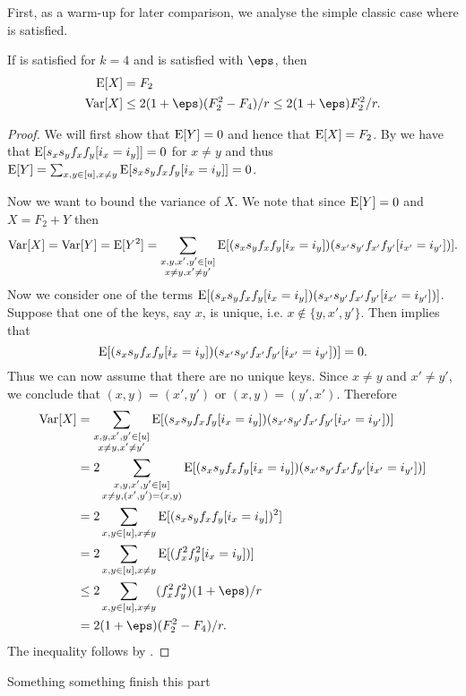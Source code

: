 First, as a warm-up for later comparison, we analyse the simple classic
case where  is satisfied.
\begin{lemma}
    If  is satisfied for $k = 4$ and 
    is satisfied with $\eps$, then
    \begin{align}
        \E[X] &= F_2 \\
        \Var[X] &\le 2(1 + \eps)(F_2^2 - F_4)/r \le 2(1 + \eps)F_2^2/r .
    \end{align}
\end{lemma}
\begin{proof}
    We will first show that $\operatorname*{E}[Y] = 0$ and hence that $\operatorname*{E}[X] = F_2$. By
     we have that $\operatorname*{E}[s_x s_y f_x f_y [i_x = i_y]] = 0$
    for $x \neq y$ and thus $\operatorname*{E}[Y] = \sum_{x,y\in[u],x\neq y} \operatorname*{E}[s_x s_y f_x f_y [i_x = i_y]] = 0$.

    Now we want to bound the variance of $X$. We note that since $\operatorname*{E}[Y] = 0$ and $X = F_2 + Y$ then
    \begin{align*}
        \operatorname*{Var}[X] = \operatorname*{Var}[Y] = \operatorname*{E}[Y^2]
            = \sum_{\substack{x, y, x', y' \in [u]\\ x \neq y, x' \neq y'}} \operatorname*{E}[(s_x s_y f_x f_y [i_x = i_y])(s_{x'} s_{y'} f_{x'} f_{y'} [i_{x'} = i_{y'}])] .
    \end{align*}
    Now we consider one of the terms $\operatorname*{E}[(s_x s_y f_x f_y [i_x = i_y])(s_{x'} s_{y'} f_{x'} f_{y'} [i_{x'} = i_{y'}])]$.
    Suppose that one of the keys, say $x$, is unique, i.e. $x \not\in \{y, x', y'\}$.
    Then  implies that 
    \[
        \operatorname*{E}[(s_x s_y f_x f_y [i_x = i_y])(s_{x'} s_{y'} f_{x'} f_{y'} [i_{x'} = i_{y'}])] = 0 .
    \]
    Thus we can now assume that there are no unique keys. Since $x \neq y$ and $x' \neq y'$, we conclude
    that $(x, y) = (x', y')$ or $(x, y) = (y', x')$. Therefore
    \begin{align*}
       \Var[X] &= \sum_{\substack{x, y, x', y' \in [u]\\ x \neq y, x' \neq y'}}
                \E[(s_x s_y f_x f_y [i_x = i_y])(s_{x'} s_{y'} f_{x'} f_{y'} [i_{x'} = i_{y'}])]
            \\&= 2 \sum_{\substack{x, y, x', y' \in [u]\\ x \neq y, (x', y') = (x, y)}}
                \E[(s_x s_y f_x f_y [i_x = i_y])(s_{x'} s_{y'} f_{x'} f_{y'} [i_{x'} = i_{y'}])]
            \\&= 2\sum_{x,y\in[u],x\neq y} \E[(s_x s_y f_x f_y[i_x=i_y])^2]
            \\&= 2\sum_{x,y\in[u],x\neq y} \E[(f_x^2f_y^2[i_x=i_y])]
            \\&\le 2\sum_{x,y\in[u],x\neq y} (f_x^2f_y^2)(1 + \eps)/r
            \\&= 2(1 + \eps) (F_2^2-F_4)/r.
    \end{align*}
    The inequality follows by .
\end{proof}
Something something finish this part

